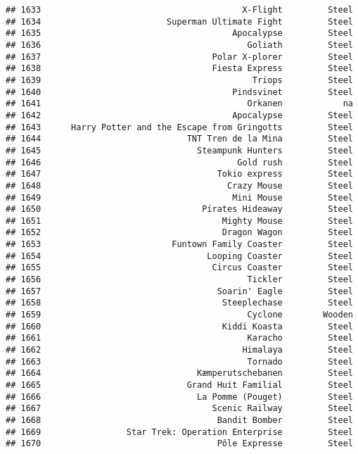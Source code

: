 \documentclass[
]{article}
\begin{document}
\begin{verbatim}
## 1633                                        X-Flight         Steel
## 1634                         Superman Ultimate Fight         Steel
## 1635                                      Apocalypse         Steel
## 1636                                         Goliath         Steel
## 1637                                  Polar X-plorer         Steel
## 1638                                  Fiesta Express         Steel
## 1639                                          Triops         Steel
## 1640                                      Pindsvinet         Steel
## 1641                                         Orkanen            na
## 1642                                      Apocalypse         Steel
## 1643      Harry Potter and the Escape from Gringotts         Steel
## 1644                             TNT Tren de la Mina         Steel
## 1645                               Steampunk Hunters         Steel
## 1646                                       Gold rush         Steel
## 1647                                   Tokio express         Steel
## 1648                                     Crazy Mouse         Steel
## 1649                                      Mini Mouse         Steel
## 1650                                Pirates Hideaway         Steel
## 1651                                    Mighty Mouse         Steel
## 1652                                    Dragon Wagon         Steel
## 1653                          Funtown Family Coaster         Steel
## 1654                                 Looping Coaster         Steel
## 1655                                  Circus Coaster         Steel
## 1656                                         Tickler         Steel
## 1657                                   Soarin' Eagle         Steel
## 1658                                    Steeplechase         Steel
## 1659                                         Cyclone        Wooden
## 1660                                    Kiddi Koasta         Steel
## 1661                                         Karacho         Steel
## 1662                                        Himalaya         Steel
## 1663                                         Tornado         Steel
## 1664                               Kæmperutschebanen         Steel
## 1665                             Grand Huit Familial         Steel
## 1666                               La Pomme (Pouget)         Steel
## 1667                                  Scenic Railway         Steel
## 1668                                   Bandit Bomber         Steel
## 1669                 Star Trek: Operation Enterprise         Steel
## 1670                                   Pôle Expresse         Steel

\end{verbatim}
\end{document}
